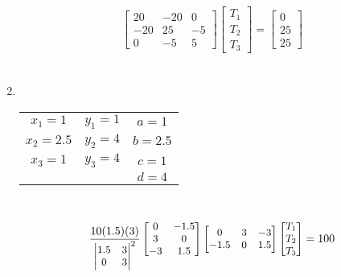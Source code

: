 \documentclass[10pt]{article}
\begin{document}
\begin{enumerate}
\begin{align*}
{\begin{bmatrix}
20 & -20 & 0\\
-20 & 25 & -5 \\
0 & -5 & 5
\end{bmatrix}
\begin{bmatrix} 
T_1 \\ T_2 \\ T_3
\end{bmatrix} =  
\begin{bmatrix} 
0 \\ 25 \\ 25
\end{bmatrix}}
\end{align*}\\
\item\mbox{}\\
\begin{minipage}{0.5\textwidth}
\end{minipage}
\begin{minipage}{0.5\textwidth}
\begin{tabular}{ccc}
$x_1 = 1$ & $y_1 = 1$ & $a = 1 $\\
$x_2 = 2.5 $& $y_2 = 4$ & $b = 2.5 $\\
$x_3 = 1$ & $y_3 = 4$ & $c = 1 $ \\
 & & $d = 4$
\end{tabular}
\end{minipage} \\
\begin{align*}
\small{
\frac{10(1.5)(3)}
{\begin{vmatrix}
1.5 & 3 \\
0 & 3
\end{vmatrix}^2} 
\begin{bmatrix}
0 & -1.5\\
 3 & 0 \\
 -3 & 1.5
\end{bmatrix} 
\begin{bmatrix}
0 & 3 & -3 \\
-1.5 & 0 & 1.5
\end{bmatrix} 
\begin{bmatrix}
T_1 \\ T_2 \\ T_3
\end{bmatrix} = 100 
}
\end{align*}
\end{enumerate}
\end{document}
